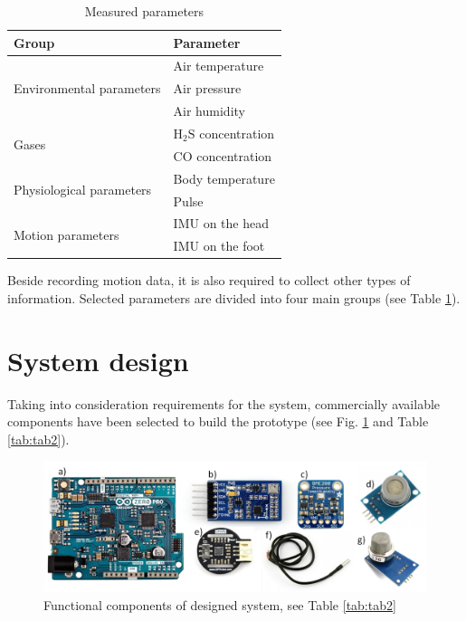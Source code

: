 \documentclass[10pt, a4paper]{article}
\begin{document}
\begin{table}[ht!]
    \centering
    \caption{Measured parameters}
  \begin{tabular}{|l|l|}
    \hline
    \textbf{Group} & \textbf{Parameter} \\ \hline
        \multirow{3}{8em}{Environmental parameters} & Air temperature \\ 
        & Air pressure \\
        & Air humidity \\ \hline
        \multirow{2}{8em}{Gases} & $\mathrm{H_2S}$ concentration \\
        & CO concentration \\ \hline
        \multirow{2}{8em}{Physiological parameters} & Body temperature \\ 
        & Pulse \\ \hline
        \multirow{2}{8em}{Motion parameters} & IMU on the head \\ 
        & IMU on the foot \\ \hline
    \end{tabular}
    \label{tab:tab1}
\end{table}

Beside recording motion data, it is also required to collect other types of information. Selected parameters are divided into four main groups (see Table \ref{tab:tab1}).

\section{System design}\label{s:design}

Taking into consideration requirements for the system, commercially available components have been selected to build the prototype (see Fig. \ref{fig:sensors} and Table \ref{tab:tab2}).

\begin{figure}[ht!]
    \centering
    \includegraphics[width=\textwidth]{fig/sensors.png}
    \caption{Functional components of designed system, see Table \ref{tab:tab2}}
    \label{fig:sensors}
\end{figure}
\end{document}
